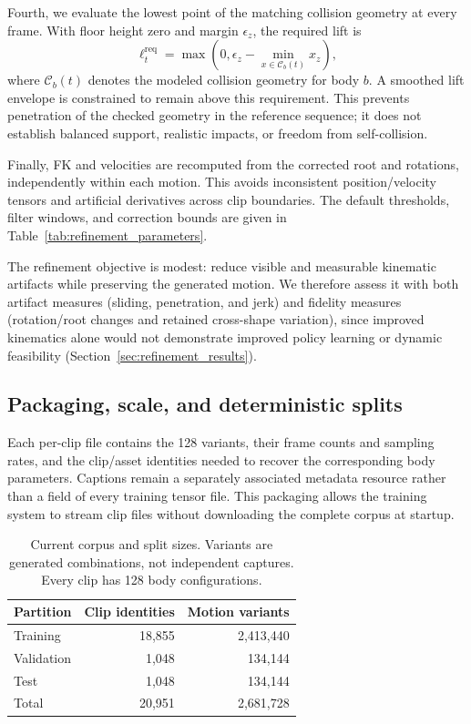 Fourth, we evaluate the lowest point of the matching collision geometry at
every frame. With floor height zero and margin $\epsilon_z$, the required lift is
\begin{equation}
    \ell_t^{\mathrm{req}}
      = \max\!\left(0,\epsilon_z-\min_{x\in\mathcal{C}_b(t)}x_z\right),
    \label{eq:clearance}
\end{equation}
where $\mathcal{C}_b(t)$ denotes the modeled collision geometry for body $b$.
A smoothed lift envelope is constrained to remain above this requirement.
This prevents penetration of the checked geometry in the reference sequence;
it does not establish balanced support, realistic impacts, or freedom from
self-collision.

Finally, FK and velocities are recomputed from the corrected root and
rotations, independently within each motion. This avoids inconsistent
position/velocity tensors and artificial derivatives across clip boundaries.
The default thresholds, filter windows, and correction bounds are given in
Table~\ref{tab:refinement_parameters}.

The refinement objective is modest: reduce visible and measurable kinematic
artifacts while preserving the generated motion. We therefore assess it with
both artifact measures (sliding, penetration, and jerk) and fidelity measures
(rotation/root changes and retained cross-shape variation), since improved
kinematics alone would not demonstrate improved policy learning or dynamic
feasibility (Section~\ref{sec:refinement_results}).

\subsection{Packaging, scale, and deterministic splits}\label{sec:splits}

Each per-clip file contains the 128 variants, their frame counts and sampling
rates, and the clip/asset identities needed to recover the corresponding body
parameters. Captions remain a separately associated metadata resource rather
than a field of every training tensor file. This packaging allows the
training system to stream clip files without downloading the complete corpus
at startup.

\begin{table}[t]
\centering
\caption{Current corpus and split sizes. Variants are generated combinations,
not independent captures. Every clip has 128 body configurations.}\label{tab:dataset_counts}
\begin{tabular}{lrr}
\toprule
Partition & Clip identities & Motion variants \\
\midrule
Training & 18,855 & 2,413,440 \\
Validation & 1,048 & 134,144 \\
Test & 1,048 & 134,144 \\
\midrule
Total & 20,951 & 2,681,728 \\
\bottomrule
\end{tabular}
\end{table}

